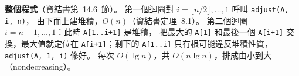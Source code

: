 \begin{pastsoln}
\textbf{整個程式}（資結書第~14.6~節）。 第一個迴圈對 $i = \lfloor n/2 \rfloor, \ldots, 1$ 呼叫 \texttt{adjust(A, i, n)}，
由下而上建堆積，$O(n)$（資結書定理~8.1）。 第二個迴圈 $i = n-1, \ldots, 1$：此時 \texttt{A[1..i+1]} 是堆積，
把最大的 \texttt{A[1]} 和最後一個 \texttt{A[i+1]} 交換，最大值就定位在 \texttt{A[i+1]}；剩下的 \texttt{A[1..i]}
只有根可能違反堆積性質，\texttt{adjust(A, 1, i)} 修好。 每次 $O(\lg n)$，共 $O(n \lg n)$，排成由小到大
（nondecreasing）。
\end{pastsoln}
